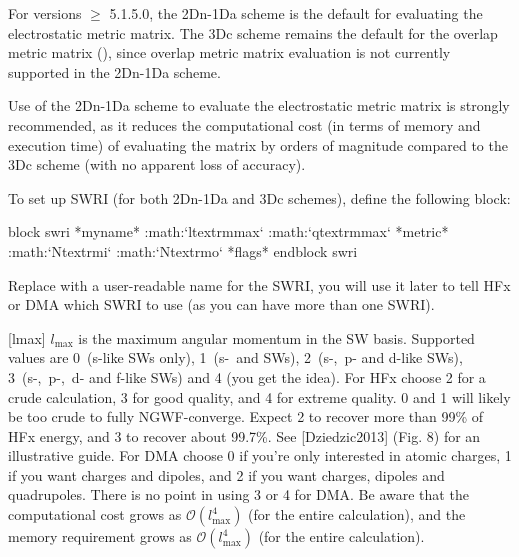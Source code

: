 \documentclass[letterpaper,10pt,english]{sphinxmanual}
\begin{document}
For versions \(\ge\) 5.1.5.0, the 2Dn-1Da scheme is the default for
evaluating the electrostatic metric matrix. The 3Dc scheme remains the
default for the overlap metric matrix (), since overlap metric
matrix evaluation is not currently supported in the 2Dn-1Da scheme.

Use of the 2Dn-1Da scheme to evaluate the electrostatic metric matrix is
strongly recommended, as it reduces the computational cost (in terms of
memory and execution time) of evaluating the matrix by orders of
magnitude compared to the 3Dc scheme (with no apparent loss of
accuracy).

To set up SWRI (for both 2Dn-1Da and 3Dc schemes), define the following
block:

%
\begin{sphinxVerbatim}[commandchars=\\\{\}]
\PYGZpc{}block swri
  *myname* :math:{}`l\PYGZus{}\PYGZob{}\PYGZbs{}textrm\PYGZob{}max\PYGZcb{}\PYGZcb{}{}` :math:{}`q\PYGZus{}\PYGZob{}\PYGZbs{}textrm\PYGZob{}max\PYGZcb{}\PYGZcb{}{}` *metric* :math:{}`N\PYGZus{}\PYGZob{}\PYGZbs{}textrm\PYGZob{}i\PYGZcb{}\PYGZcb{}{}` :math:{}`N\PYGZus{}\PYGZob{}\PYGZbs{}textrm\PYGZob{}o\PYGZcb{}\PYGZcb{}{}` *flags*
\PYGZpc{}endblock swri
\end{sphinxVerbatim}

Replace  with a user-readable name for the SWRI, you will
use it later to tell HFx or DMA which SWRI to use (as you can have more
than one SWRI).

{[}lmax{]} \(l_{\textrm{max}}\) is the maximum angular momentum in the
SW basis. Supported values are 0 (s-like SWs only), 1 (s- and SWs),
2 (s-, p- and d-like SWs), 3 (s-, p-, d- and f-like SWs) and 4 (you get
the idea). For HFx choose 2 for a crude calculation, 3 for good quality,
and 4 for extreme quality. 0 and 1 will likely be too crude to fully
NGWF-converge. Expect 2 to recover more than 99\% of HFx energy, and 3 to
recover about 99.7\%. See {[}Dziedzic2013{]} (Fig. 8) for an
illustrative guide. For DMA choose 0 if you’re only interested in atomic
charges, 1 if you want charges and dipoles, and 2 if you want charges,
dipoles and quadrupoles. There is no point in using 3 or 4 for DMA. Be
aware that the computational cost grows as
\({\mathcal{O}}(l^4_{\textrm{max}})\) (for the entire calculation),
and the memory requirement grows as
\({\mathcal{O}}(l^4_{\textrm{max}})\) (for the entire calculation).
\end{document}
